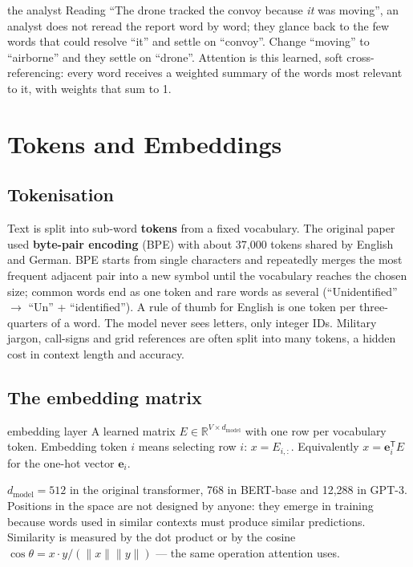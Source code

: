 \documentclass[11pt]{article}
\begin{document}
\begin{intuition}{the analyst}
Reading ``The drone tracked the convoy because \emph{it} was moving'', an analyst does not reread the report word by word; they glance back to the few words that could resolve ``it'' and settle on ``convoy''. Change ``moving'' to ``airborne'' and they settle on ``drone''. Attention is this learned, soft cross-referencing: every word receives a weighted summary of the words most relevant to it, with weights that sum to 1.
\end{intuition}

\section{Tokens and Embeddings}
\subsection{Tokenisation}
Text is split into sub-word \textbf{tokens} from a fixed vocabulary. The original paper used \textbf{byte-pair encoding} (BPE) with about 37,000 tokens shared by English and German. BPE starts from single characters and repeatedly merges the most frequent adjacent pair into a new symbol until the vocabulary reaches the chosen size; common words end as one token and rare words as several (``Unidentified'' $\to$ ``Un'' + ``identified''). A rule of thumb for English is one token per three-quarters of a word. The model never sees letters, only integer IDs. Military jargon, call-signs and grid references are often split into many tokens, a hidden cost in context length and accuracy.

\subsection{The embedding matrix}
\begin{definition}{embedding layer}
A learned matrix $E\in\mathbb R^{V\times d_{\text{model}}}$ with one row per vocabulary token. Embedding token $i$ means selecting row $i$: $x=E_{i,:}$. Equivalently $x=\mathbf e_i^{\mathsf T}E$ for the one-hot vector $\mathbf e_i$.
\end{definition}
$d_{\text{model}}=512$ in the original transformer, 768 in BERT-base and 12,288 in GPT-3. Positions in the space are not designed by anyone: they emerge in training because words used in similar contexts must produce similar predictions. Similarity is measured by the dot product or by the cosine $\cos\theta=x\cdot y/(\lVert x\rVert\lVert y\rVert)$ --- the same operation attention uses.
\end{document}

